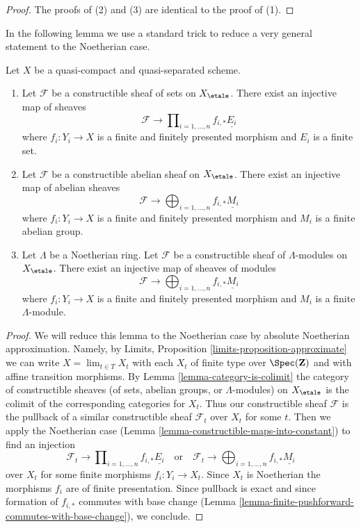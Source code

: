 \begin{proof}
\medskip\noindent
The proofs of (2) and (3) are identical to the proof of (1).
\end{proof}

\noindent
In the following lemma we use a standard trick to reduce a very general
statement to the Noetherian case.

\begin{lemma}
\label{lemma-constructible-maps-into-constant-general}
\begin{reference}
\cite[Exposee IX, Proposition 2.14]{SGA4}
\end{reference}
Let $X$ be a quasi-compact and quasi-separated scheme.
\begin{enumerate}
\item Let $\mathcal{F}$ be a constructible sheaf of sets on $X_\etale$.
There exist an injective map of sheaves
$$
\mathcal{F} \longrightarrow
\prod\nolimits_{i = 1, \ldots, n} f_{i, *}\underline{E_i}
$$
where $f_i : Y_i \to X$ is a finite and finitely presented morphism and
$E_i$ is a finite set.
\item Let $\mathcal{F}$ be a constructible abelian sheaf on $X_\etale$.
There exist an injective map of abelian sheaves
$$
\mathcal{F} \longrightarrow
\bigoplus\nolimits_{i = 1, \ldots, n} f_{i, *}\underline{M_i}
$$
where $f_i : Y_i \to X$ is a finite and finitely presented morphism and
$M_i$ is a finite abelian group.
\item Let $\Lambda$ be a Noetherian ring.
Let $\mathcal{F}$ be a constructible sheaf of $\Lambda$-modules on $X_\etale$.
There exist an injective map of sheaves of modules
$$
\mathcal{F} \longrightarrow
\bigoplus\nolimits_{i = 1, \ldots, n} f_{i, *}\underline{M_i}
$$
where $f_i : Y_i \to X$ is a finite and finitely presented morphism and
$M_i$ is a finite $\Lambda$-module.
\end{enumerate}
\end{lemma}

\begin{proof}
We will reduce this lemma to the Noetherian case by absolute Noetherian
approximation. Namely, by
Limits, Proposition \ref{limits-proposition-approximate}
we can write $X = \lim_{t \in T} X_t$ with each $X_t$ of finite type over
$\Spec(\mathbf{Z})$ and with affine transition morphisms. By
Lemma \ref{lemma-category-is-colimit}
the category of constructible sheaves (of sets, abelian groups, or
$\Lambda$-modules) on $X_\etale$ is the colimit of the corresponding
categories for $X_t$. Thus our constructible sheaf $\mathcal{F}$
is the pullback of a similar constructible sheaf $\mathcal{F}_t$
over $X_t$ for some $t$. Then we apply the Noetherian case
(Lemma \ref{lemma-constructible-maps-into-constant})
to find an injection
$$
\mathcal{F}_t \longrightarrow
\prod\nolimits_{i = 1, \ldots, n} f_{i, *}\underline{E_i}
\quad\text{or}\quad
\mathcal{F}_t \longrightarrow
\bigoplus\nolimits_{i = 1, \ldots, n} f_{i, *}\underline{M_i}
$$
over $X_t$ for some finite morphisms $f_i : Y_i \to X_t$.
Since $X_t$ is Noetherian the morphisms $f_i$ are of finite presentation.
Since pullback is exact and since formation of $f_{i, *}$ commutes
with base change
(Lemma \ref{lemma-finite-pushforward-commutes-with-base-change}), we conclude.
\end{proof}

